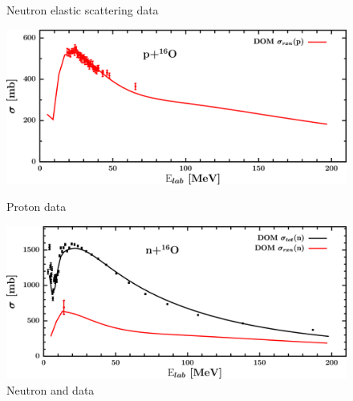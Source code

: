 \begin{figure}[H]
\begin{minipage}{0.45\textwidth}
        \caption{Neutron elastic scattering data}
        \label{DOMFitData_o16_neutron_elastic}
    \end{minipage}
\end{figure}

\begin{figure}[H]
    \centering
    \begin{minipage}{0.45\textwidth}
        \centering
        \includegraphics[width=1.0\textwidth]{figures/o16_protonInelastic.png}
        \caption{Proton \rxn data}
        \label{DOMFitData_o16_proton_inelastic}
    \end{minipage}\hfill
    \begin{minipage}{0.45\textwidth}
        \centering
        \includegraphics[width=1.0\textwidth]{figures/o16_neutronInelastic.png}
        \caption{Neutron \rxn and \tot data}
        \label{DOMFitData_o16_neutron_inelastic}
    \end{minipage}
\end{figure}

\afterpage{\clearpage}

